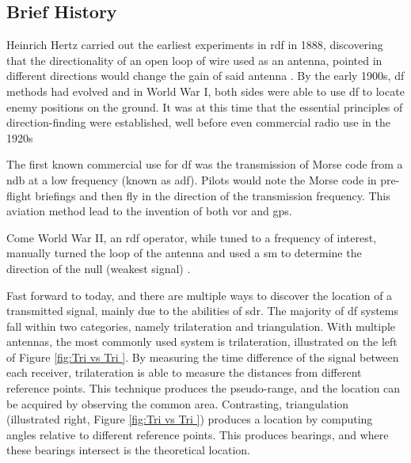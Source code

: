 \documentclass[class=report,11pt,crop=false]{standalone}
\begin{document}
\subsection{Brief History}
Heinrich Hertz carried out the earliest experiments in \gls{rdf} in 1888, discovering that the  directionality of an open loop of wire used as an antenna, pointed in different directions would change the gain of said antenna \cite{hertz-expeirments}. By the early 1900s, \gls{df} methods had evolved and in World War I, both sides were able to use \gls{df} to locate enemy positions on the ground. It was at this time that the essential principles of direction-finding were established, well before even commercial radio use in the 1920s \cite{df-history}

The first known commercial use for \gls{df} was the transmission of Morse code from a \gls{ndb} at a low frequency (known as \gls{adf}). Pilots would note the Morse code in pre-flight briefings and then fly in the direction of the transmission frequency. This aviation method lead to the invention of both \gls{vor} and \gls{gps}.

Come World War II, an \gls{rdf} operator, while tuned to a frequency of interest, manually turned the loop of the antenna and used a \gls{sm} to determine the direction of the null (weakest signal) \cite{df-history}.

Fast forward to today, and there are multiple ways to discover the location of a transmitted signal, mainly due to the abilities of \gls{sdr}. The majority of \gls{df} systems fall within two categories, namely trilateration and triangulation. With multiple antennas, the most commonly used system is trilateration, illustrated on the left of Figure \ref{fig:Tri vs Tri }. By measuring the time difference of the signal between each receiver, trilateration is able to measure the distances from different reference points. This technique  produces the pseudo-range, and the location can be acquired by observing the common area. Contrasting, triangulation (illustrated right, Figure \ref{fig:Tri vs Tri }) produces a location by computing angles relative to different reference points. This produces bearings, and where these bearings intersect is the theoretical location. 
\end{document}
